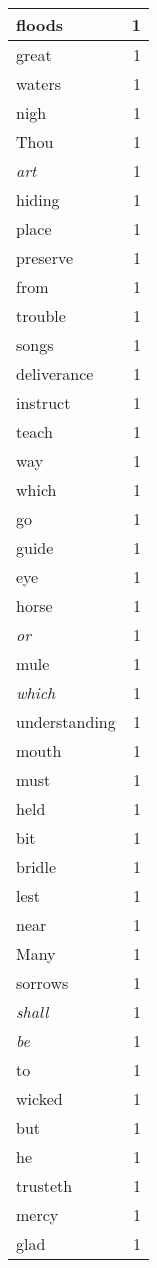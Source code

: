 \begin{center}
\begin{longtable}{l|r}
floods & 1 \\ \hline
great & 1 \\ \hline
waters & 1 \\ \hline
nigh & 1 \\ \hline
Thou & 1 \\ \hline
\emph{art} & 1 \\ \hline
hiding & 1 \\ \hline
place & 1 \\ \hline
preserve & 1 \\ \hline
from & 1 \\ \hline
trouble & 1 \\ \hline
songs & 1 \\ \hline
deliverance & 1 \\ \hline
instruct & 1 \\ \hline
teach & 1 \\ \hline
way & 1 \\ \hline
which & 1 \\ \hline
go & 1 \\ \hline
guide & 1 \\ \hline
eye & 1 \\ \hline
horse & 1 \\ \hline
\emph{or} & 1 \\ \hline
mule & 1 \\ \hline
\emph{which} & 1 \\ \hline
understanding & 1 \\ \hline
mouth & 1 \\ \hline
must & 1 \\ \hline
held & 1 \\ \hline
bit & 1 \\ \hline
bridle & 1 \\ \hline
lest & 1 \\ \hline
near & 1 \\ \hline
Many & 1 \\ \hline
sorrows & 1 \\ \hline
\emph{shall} & 1 \\ \hline
\emph{be} & 1 \\ \hline
to & 1 \\ \hline
wicked & 1 \\ \hline
but & 1 \\ \hline
he & 1 \\ \hline
trusteth & 1 \\ \hline
mercy & 1 \\ \hline
glad & 1 \\ \hline

\end{longtable}
\end{center}
